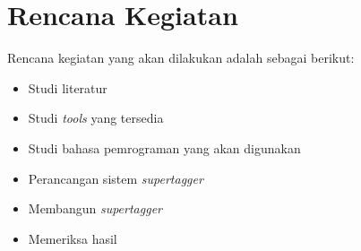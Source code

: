 \section{Rencana Kegiatan}
Rencana kegiatan yang akan dilakukan adalah sebagai berikut:
\begin{itemize}
    \item Studi literatur
    \item Studi \textit{tools} yang tersedia
    \item Studi bahasa pemrograman yang akan digunakan
    \item Perancangan sistem \textit{supertagger}
    \item Membangun \textit{supertagger}
    \item Memeriksa hasil
\end{itemize}


